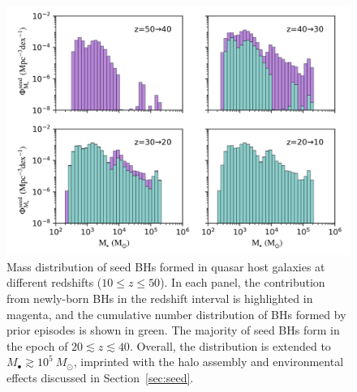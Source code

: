 \documentclass[twocolumn, twocolappendix]{aastex63}
\newcommand{\Msun}{M_\odot}
\begin{document}
\begin{CJK*}{UTF8}{gbsn}
\begin{figure}
\centering
\includegraphics[width=140mm]{seedBHMF_z.png}
\caption{
Mass distribution of seed BHs formed in quasar host galaxies at different redshifts ($10\leq z \leq 50$).
In each panel, the contribution from newly-born BHs in the redshift interval is highlighted in magenta,
and the cumulative number distribution of BHs formed by prior episodes is shown in green.
The majority of seed BHs form in the epoch of $20\lesssim z \lesssim 40$.
Overall, the distribution is extended to $M_\bullet \gtrsim 10^5~\Msun$, 
imprinted with the halo assembly and environmental effects discussed in Section~\ref{sec:seed}.
}
\label{fig:seedmf}
\vspace{5mm}
\end{figure}



\end{CJK*}
\end{document}
